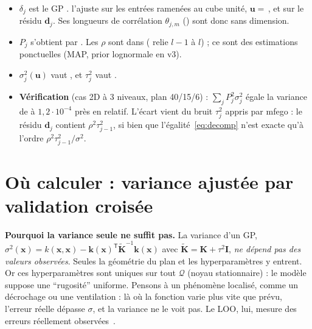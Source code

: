 \documentclass[10pt,a4paper]{article}
\theoremstyle{plain}
\newcommand{\vx}{\bm{x}}
\newcommand{\vu}{\bm{u}}
\newcommand{\vd}{\bm{d}}
\newcommand{\Kt}{\widetilde{\bm{K}}}
\newcommand{\Q}{\mathcal{Q}}
\newcommand{\tp}{^{\mathsf{T}}}
\begin{document}
\begin{danslecode}
\begin{itemize}
  \item $\delta_j$ est le GP .  l'ajuste sur les entrées ramenées au
        cube unité, $\vu=$\,, et sur le résidu $\vd_j$. Ses longueurs de corrélation
        $\theta_{j,m}$ () sont donc sans dimension.
  \item $P_j$ s'obtient par . Les $\rho$ sont dans
         ( relie $l-1$ à $l$) ; ce sont des estimations ponctuelles (MAP, prior
        lognormale en v3).
  \item $\sigma_j^2(\vu)$ vaut , et $\tau_j^2$ vaut
        .
  \item \textbf{Vérification} (cas 2D à 3 niveaux, plan 40/15/6) : $\sum_j P_j^2\sigma_j^2$ égale la variance
        de  à $1{,}2\cdot10^{-4}$ près en relatif.
        L'écart vient du bruit $\tau_j^2$ appris par mfego : le résidu $\vd_j$ contient $\rho^2\tau_{j-1}^2$,
        si bien que l'égalité~\eqref{eq:decomp} n'est exacte qu'à l'ordre $\rho^2\tau_{j-1}^2/\sigma^2$.
\end{itemize}
\end{danslecode}

\section{Où calculer : variance ajustée par validation croisée}\label{sec:point}
\textbf{Pourquoi la variance seule ne suffit pas.} La variance d'un GP,
$\sigma^2(\vx)=k(\vx,\vx)-\bm{k}(\vx)\tp\Kt^{-1}\bm{k}(\vx)$ avec $\Kt=\bm{K}+\tau^2\bm{I}$,
\emph{ne dépend pas des valeurs observées}. Seules la géométrie du plan et les hyperparamètres y entrent.
Or ces hyperparamètres sont uniques sur tout $\Q$ (noyau stationnaire) : le modèle suppose une
\enquote{rugosité} uniforme. Pensons à un phénomène localisé, comme un décrochage ou une ventilation : là où
la fonction varie plus vite que prévu, l'erreur réelle dépasse $\sigma$, et la variance ne le voit pas. Le
LOO, lui, mesure des erreurs réellement observées~\cite{LGC15,KvB04}.
\end{document}

